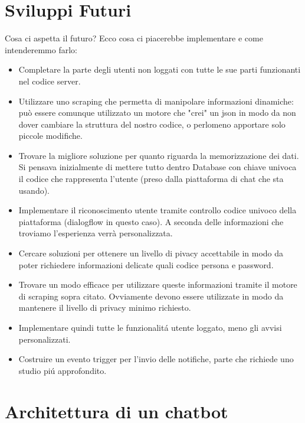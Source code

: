 \documentclass[]{article}
\begin{document}
\section{Sviluppi Futuri}
Cosa ci aspetta il futuro? Ecco cosa ci piacerebbe implementare e come intenderemmo farlo:
\begin{itemize}
\item Completare la parte degli utenti non loggati con tutte le sue parti funzionanti nel codice server.
\item Utilizzare uno scraping che permetta di manipolare informazioni dinamiche: può essere comunque utilizzato un motore che "crei" un json in modo da non dover cambiare la struttura del nostro codice, o perlomeno apportare solo piccole modifiche.
\item Trovare la migliore soluzione per quanto riguarda la memorizzazione dei dati. Si pensava inizialmente di mettere tutto dentro Database con chiave univoca il codice che rappresenta l'utente (preso dalla piattaforma di chat che sta usando).
\item Implementare il riconoscimento utente tramite controllo codice univoco della piattaforma (dialogflow in questo caso). A seconda delle informazioni che troviamo l'esperienza verrà personalizzata.
\item Cercare soluzioni per ottenere un livello di pivacy accettabile in modo da poter richiedere informazioni delicate quali codice persona e password.
\item Trovare un modo efficace per utilizzare queste informazioni tramite il motore di scraping sopra citato. Ovviamente devono essere utilizzate in modo da mantenere il livello di privacy minimo richiesto.
\item Implementare quindi tutte le funzionalitá utente loggato, meno gli avvisi personalizzati.
\item Costruire un evento trigger per l'invio delle notifiche, parte che richiede uno studio piú approfondito.
\end{itemize}



\appendix

\pagebreak
\section{ Architettura di un chatbot }
\end{document}
